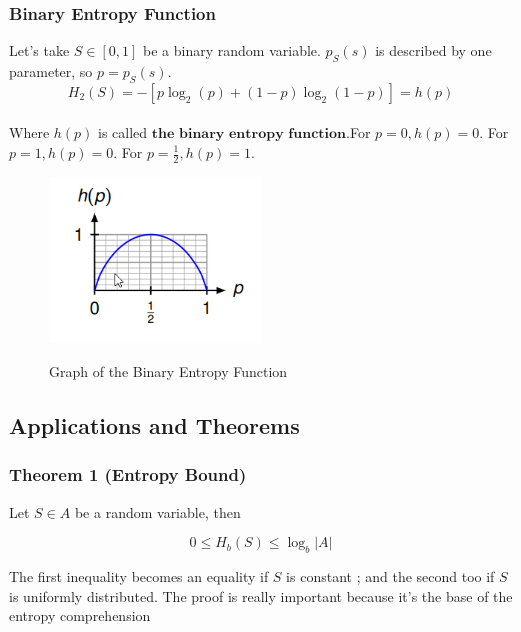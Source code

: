 \documentclass{article}
\begin{document}
\subsubsection{Binary Entropy Function} Let's take $ S \in [0, 1] $ be a binary random variable. $ p_S(s) $ is described by one parameter, so $ p = p_S(s) $.
\begin{equation}
H_2(S) = - [p\log_2(p) + (1-p)\log_2(1-p)] = h(p)
\end{equation}
\\
Where $ h(p) $ is called $ \textbf{the binary entropy function} $.For $ p = 0, h(p) = 0 $. For $ p = 1, h(p) = 0 $. For $ p = \frac{1}{2}, h(p) = 1 $.
\\
\begin{figure}[h]
  \hfill\includegraphics[width=0.5\textwidth]{binaryfunction.png}\hspace*{\fill}
  \label{fig:binaryfunction}
  
  \caption{Graph of the Binary Entropy Function}
\end{figure}

\subsection{Applications and Theorems}
\subsubsection{Theorem 1 (Entropy Bound)} Let $ S \in A $ be a random variable, then
\begin{tcolorbox}[sharp corners, colback=green!30, colframe=green!80!blue, title=Entropy Bound]
\begin{equation}
0 \leq H_b(S) \leq \log_b| A |
\end{equation}
\end{tcolorbox}
The first inequality becomes an equality if $ S $ is constant ; and the second too if $ S $ is uniformly distributed. The proof is really important because it's the base of the entropy comprehension
\end{document}
